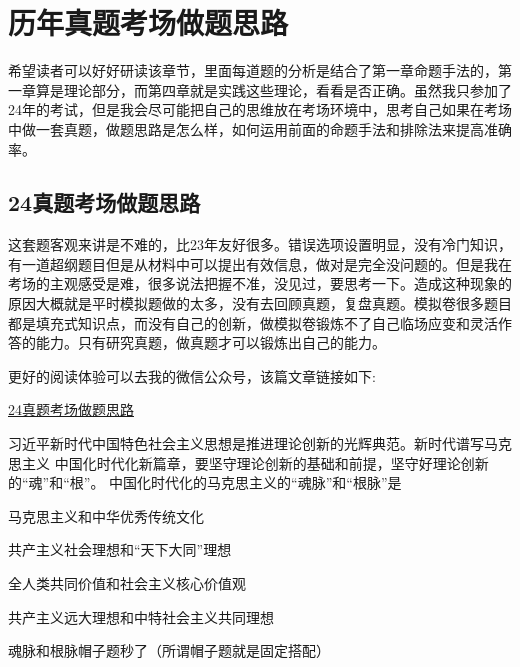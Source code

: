 \documentclass[lang=cn,newtx,10pt,scheme=chinese,pad,twocol]{zznote}
\begin{document}
\chapter{历年真题考场做题思路}
希望读者可以好好研读该章节，里面每道题的分析是结合了第一章命题手法的，第一章算是理论部分，而第四章就是实践这些理论，看看是否正确。虽然我只参加了24年的考试，但是我会尽可能把自己的思维放在考场环境中，思考自己如果在考场中做一套真题，做题思路是怎么样，如何运用前面的命题手法和排除法来提高准确率。
\section{24真题考场做题思路}
\begin{conclusion}
	这套题客观来讲是不难的，比23年友好很多。错误选项设置明显，没有冷门知识，有一道超纲题目但是从材料中可以提出有效信息，做对是完全没问题的。但是我在考场的主观感受是难，很多说法把握不准，没见过，要思考一下。造成这种现象的原因大概就是平时模拟题做的太多，没有去回顾真题，复盘真题。模拟卷很多题目都是填充式知识点，而没有自己的创新，做模拟卷锻炼不了自己临场应变和灵活作答的能力。只有研究真题，做真题才可以锻炼出自己的能力。
\end{conclusion}
更好的阅读体验可以去我的微信公众号，该篇文章链接如下:

\href{https://mp.weixin.qq.com/s/Y1YAdhgg9kceCpxVkEPnhQ}{24真题考场做题思路}

\begin{exercise}习近平新时代中国特色社会主义思想是推进理论创新的光辉典范。新时代谱写马克思主义 中国化时代化新篇章，要坚守理论创新的基础和前提，坚守好理论创新的“魂”和“根”。 中国化时代化的马克思主义的“魂脉”和“根脉”是
	\begin{choice}
		\item 马克思主义和中华优秀传统文化
		\item 共产主义社会理想和“天下大同”理想
		\item 全人类共同价值和社会主义核心价值观
		\item 共产主义远大理想和中特社会主义共同理想
	\end{choice}
\end{exercise}
\begin{solution}
	魂脉和根脉帽子题秒了（所谓帽子题就是固定搭配）
\end{solution}
\end{document}

